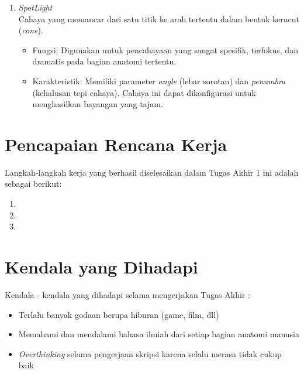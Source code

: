 \documentclass[a4paper,twoside]{article}
\begin{document}
\begin{enumerate}
\begin{itemize}
\begin{enumerate}
                        \item \textit{SpotLight} \\
                        Cahaya yang memancar dari satu titik ke arah tertentu dalam bentuk kerucut (\textit{cone}).
                        \begin{itemize}
                            \item Fungsi: Digunakan untuk pencahayaan yang sangat spesifik, terfokus, dan dramatis pada bagian anatomi tertentu.
                            \item Karakteristik: Memiliki parameter \textit{angle} (lebar sorotan) dan \textit{penumbra} (kehalusan tepi cahaya). Cahaya ini dapat dikonfigurasi untuk menghasilkan bayangan yang tajam.
                        \end{itemize}
                    \end{enumerate}
             \end{itemize}    
        
	      \end{enumerate}

\section{Pencapaian Rencana Kerja}
Langkah-langkah kerja yang berhasil diselesaikan dalam Tugas Akhir 1 ini adalah sebagai berikut:
\begin{enumerate}
\item
\item
\item
\end{enumerate}



\section{Kendala yang Dihadapi}
Kendala - kendala yang dihadapi selama mengerjakan Tugas Akhir :
\begin{itemize}
	\item Terlalu banyak godaan berupa hiburan (game, film, dll) 
    \item Memahami dan mendalami bahasa ilmiah dari setiap bagian anatomi manusia 
    \item \textit{Overthinking} selama pengerjaan skripsi karena selalu merasa tidak cukup baik

\end{itemize}
\end{document}
